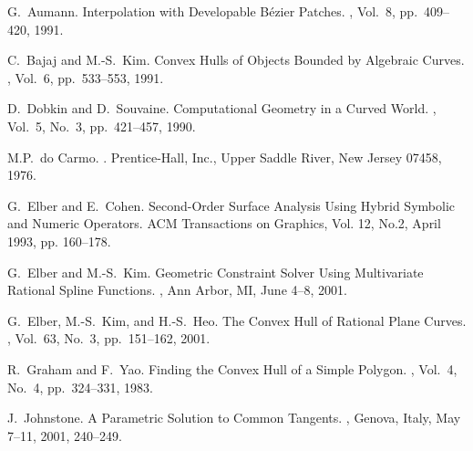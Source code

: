 \documentclass[11pt]{article}          %
\begin{document}


\begin{thebibliography}{99}

G.~Aumann.
\newblock Interpolation with Developable B\'ezier Patches.
,
Vol.~8, pp.~409--420, 1991.

C.~Bajaj and M.-S.~Kim.
\newblock Convex Hulls of Objects Bounded by Algebraic Curves.
, Vol.~6, pp.~533--553, 1991.

D.~Dobkin and D.~Souvaine.
\newblock Computational Geometry in a Curved World.
, Vol.~5, No.~3, pp.~421--457, 1990.

M.P.~do Carmo.
.
\newblock Prentice-Hall, Inc., Upper Saddle River, New Jersey 07458, 1976.

G.~Elber and E.~Cohen.
\newblock Second-Order Surface Analysis Using Hybrid Symbolic and
Numeric Operators.
\newblock ACM Transactions on Graphics, Vol. 12, No.2, April 1993, 
pp. 160--178.

G.~Elber and M.-S.~Kim.
\newblock Geometric Constraint Solver
Using Multivariate Rational Spline Functions.
,
Ann Arbor, MI, June 4--8, 2001.

G.~Elber, M.-S.~Kim, and H.-S.~Heo.
\newblock The Convex Hull of Rational Plane Curves.
, Vol.~63, No.~3, pp.~151--162, 2001.

R.~Graham and F.~Yao.
\newblock Finding the Convex Hull of a Simple Polygon.
, Vol.~4, No.~4, pp.~324--331, 1983.


J.~Johnstone.
\newblock A Parametric Solution to Common Tangents.
,
Genova, Italy, May 7--11, 2001, 240--249.




\end{thebibliography}
\end{document}
